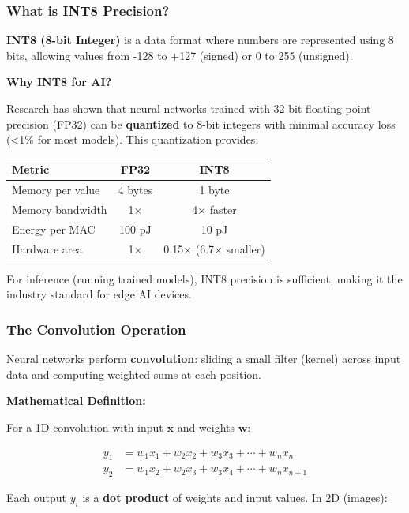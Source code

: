\documentclass[12pt,a4paper]{article}
\begin{document}
\subsubsection{What is INT8 Precision?}

\textbf{INT8 (8-bit Integer)} is a data format where numbers are represented using 8 bits, allowing values from -128 to +127 (signed) or 0 to 255 (unsigned).
\newpage
 
\textbf{Why INT8 for AI?}

Research has shown that neural networks trained with 32-bit floating-point precision (FP32) can be \textbf{quantized} to 8-bit integers with minimal accuracy loss (<1\% for most models). This quantization provides:

\begin{table}[H]
\centering
\begin{tabular}{@{}lcc@{}}
\toprule
\textbf{Metric} & \textbf{FP32} & \textbf{INT8} \\
\midrule
Memory per value & 4 bytes & 1 byte \\
Memory bandwidth & 1× & 4× faster \\
Energy per MAC & 100 pJ & 10 pJ \\
Hardware area & 1× & 0.15× (6.7× smaller) \\
\bottomrule
\end{tabular}
\end{table}

For inference (running trained models), INT8 precision is sufficient, making it the industry standard for edge AI devices.

\subsubsection{The Convolution Operation}

Neural networks perform \textbf{convolution}: sliding a small filter (kernel) across input data and computing weighted sums at each position.

\textbf{Mathematical Definition:}

For a 1D convolution with input $\mathbf{x}$ and weights $\mathbf{w}$:

\begin{align}
    y_1 &= w_1 x_1 + w_2 x_2 + w_3 x_3 + \cdots + w_n x_n \nonumber \\
    y_2 &= w_1 x_2 + w_2 x_3 + w_3 x_4 + \cdots + w_n x_{n+1} \nonumber
\end{align}

Each output $y_i$ is a \textbf{dot product} of weights and input values. In 2D (images):
\end{document}
